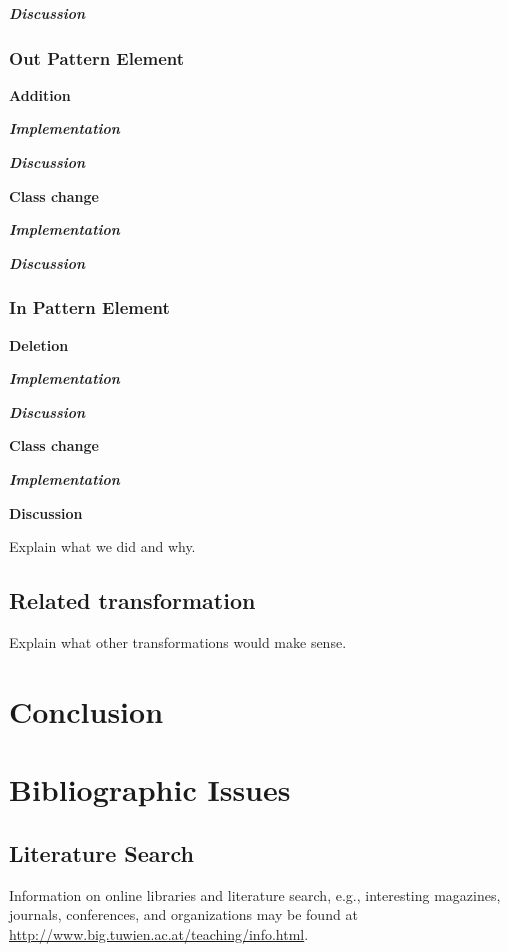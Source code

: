 \documentclass{llncs}
\begin{document}
\textbf\textit{{Discussion}}

\subsubsection{Out Pattern Element}

\textbf{Addition}

\textbf\textit{{Implementation}}

\textbf\textit{{Discussion}}

\textbf{Class change}

\textbf\textit{{Implementation}}

\textbf\textit{{Discussion}}

\subsubsection{In Pattern Element}

\textbf{Deletion}

\textbf\textit{{Implementation}}

\textbf\textit{{Discussion}}

\textbf{Class change}

\textbf\textit{{Implementation}}

\textbf{Discussion}

Explain what we did and why.

\subsection{Related transformation}

Explain what other transformations would make sense.

\section{Conclusion}

\section{Bibliographic Issues}

\subsection{Literature Search}

Information on online libraries and literature search, e.g., interesting magazines, journals, conferences, and organizations may be found at \url{http://www.big.tuwien.ac.at/teaching/info.html}.
\end{document}
